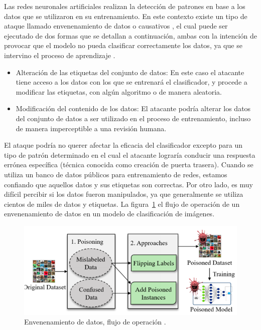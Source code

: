 Las redes neuronales artificiales realizan la detección de patrones en base a los datos que se utilizaron en su entrenamiento. En este contexto existe un tipo de ataque llamado envenenamiento de datos o causativos \parencite{r43}, el cual puede ser ejecutado de dos formas que se detallan a continuación, ambas con la intención de provocar que el modelo no pueda clasificar correctamente los datos, ya que se intervino el proceso de aprendizaje \parencite{r34}. 

\begin{itemize}
\item Alteración de las etiquetas del conjunto de datos: En este caso el atacante tiene acceso a los datos con los que se entrenará el clasificador, y procede a modificar las etiquetas, con algún algoritmo o de manera aleatoria.
\item Modificación del contenido de los datos: El atacante podría alterar los datos del conjunto de datos a ser utilizado en el proceso de entrenamiento, incluso de manera imperceptible a una revisión humana. 
\end{itemize}

El ataque podría no querer afectar la eficacia del clasificador excepto para un tipo de patrón determinado en el cual el atacante lograría conducir una respuesta errónea específica (técnica conocida como creación de puerta trasera). Cuando se utiliza un banco de datos públicos para entrenamiento de redes, estamos confiando que aquellos datos y sus etiquetas son correctas. Por otro lado, es muy difícil percibir si los datos fueron manipulados, ya que generalmente se utiliza cientos de miles de datos y etiquetas. La figura~\ref{fig:15} el flujo de operación de un envenenamiento de datos en un modelo de clasificación de imágenes.

\begin{figure}[th]
\centering
\includegraphics [scale = 0.85] {Figures/figura_15.PNG}
\decoRule
\caption[Envenenamiento de datos]{Envenenamiento de datos, flujo de operación \parencite{r32}
.}
\label{fig:15}
\end{figure}



